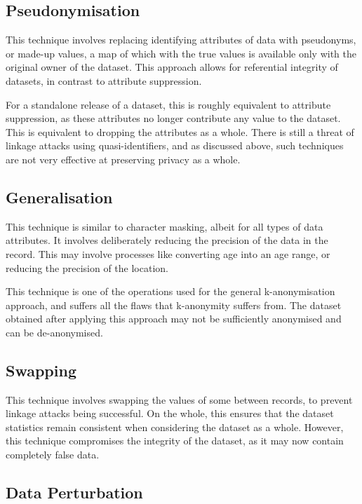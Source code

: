 \documentclass[11pt, a4paper]{article}
\begin{document}
\subsection{Pseudonymisation}

This technique involves replacing identifying attributes of data with pseudonyms, or made-up values, a map of which with the true values is available only with the original owner of the dataset. This approach allows for referential integrity of datasets, in contrast to attribute suppression.

For a standalone release of a dataset, this is roughly equivalent to attribute suppression, as these attributes no longer contribute any value to the dataset. This is equivalent to dropping the attributes as a whole. There is still a threat of linkage attacks using quasi-identifiers, and as discussed above, such techniques are not very effective at preserving privacy as a whole.

\subsection{Generalisation}

This technique is similar to character masking, albeit for all types of data attributes. It involves deliberately reducing the precision of the data in the record. This may involve processes like converting age into an age range, or reducing the precision of the location.

This technique is one of the operations used for the general k-anonymisation approach, and suffers all the flaws that k-anonymity suffers from. The dataset obtained after applying this approach may not be sufficiently anonymised and can be de-anonymised.

\subsection{Swapping}

This technique involves swapping the values of some between records, to prevent linkage attacks being successful. On the whole, this ensures that the dataset statistics remain consistent when considering the dataset as a whole. However, this technique compromises the integrity of the dataset, as it may now contain completely false data.

\subsection{Data Perturbation}
\end{document}
